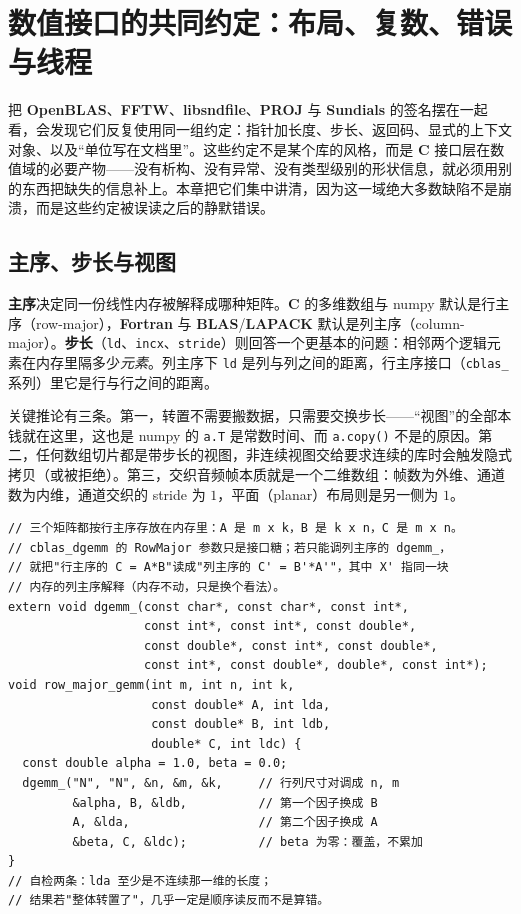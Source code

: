 \documentclass[12pt,a4paper,fontset=fandol]{ctexbook}
\newcommand{\Tp}[1]{\texttt{#1}}
\newcommand{\Bk}{\allowbreak}
\newcommand{\Lib}[1]{\textbf{#1}}
\newcommand{\Lang}[1]{\textsf{\bfseries #1}}
\newcommand{\CL}{\Lang{C}}
\newcommand{\FTN}{\Lang{Fortran}}
\begin{document}
\chapter{数值接口的共同约定：布局、复数、错误与线程}

把 \Lib{OpenBLAS}、\Lib{FFTW}、\Lib{libsndfile}、\Lib{PROJ} 与 \Lib{Sundials} 的签名摆在一起看，会发现它们反复使用同一组约定：指针加长度、步长、返回码、显式的上下文对象、以及``单位写在文档里''。这些约定不是某个库的风格，而是 \CL{} 接口层在数值域的必要产物——没有析构、没有异常、没有类型级别的形状信息，就必须用别的东西把缺失的信息补上。本章把它们集中讲清，因为这一域绝大多数缺陷不是崩溃，而是这些约定被误读之后的静默错误。

\section{主序、步长与视图}

\textbf{主序}决定同一份线性内存被解释成哪种矩阵。\CL{} 的多维数组与 numpy 默认是行主序（row-major），\FTN{} 与 \Lib{BLAS}/{\Bk}\Lib{LAPACK} 默认是列主序（column-major）。\textbf{步长}（\Tp{ld}、\Tp{incx}、\Tp{stride}）则回答一个更基本的问题：相邻两个逻辑元素在内存里隔多少\emph{元素}。列主序下 \Tp{ld} 是列与列之间的距离，行主序接口（\Tp{cblas\_} 系列）里它是行与行之间的距离。

关键推论有三条。第一，转置不需要搬数据，只需要交换步长——``视图''的全部本钱就在这里，这也是 numpy 的 \Tp{a.T} 是常数时间、而 \Tp{a.copy()} 不是的原因。第二，任何数组切片都是带步长的视图，非连续视图交给要求连续的库时会触发隐式拷贝（或被拒绝）。第三，交织音频帧本质就是一个二维数组：帧数为外维、通道数为内维，通道交织的 stride 为 $1$，平面（planar）布局则是另一侧为 $1$。

\begin{lstlisting}[style=cstyle,caption={行主序数据交给列主序内核：靠转置恒等式避免搬数据},label={lst:ch03-order}]
// 三个矩阵都按行主序存放在内存里：A 是 m x k，B 是 k x n，C 是 m x n。
// cblas_dgemm 的 RowMajor 参数只是接口糖；若只能调列主序的 dgemm_，
// 就把"行主序的 C = A*B"读成"列主序的 C' = B'*A'"，其中 X' 指同一块
// 内存的列主序解释（内存不动，只是换个看法）。
extern void dgemm_(const char*, const char*, const int*,
                   const int*, const int*, const double*,
                   const double*, const int*, const double*,
                   const int*, const double*, double*, const int*);
void row_major_gemm(int m, int n, int k,
                    const double* A, int lda,
                    const double* B, int ldb,
                    double* C, int ldc) {
  const double alpha = 1.0, beta = 0.0;
  dgemm_("N", "N", &n, &m, &k,     // 行列尺寸对调成 n, m
         &alpha, B, &ldb,          // 第一个因子换成 B
         A, &lda,                  // 第二个因子换成 A
         &beta, C, &ldc);          // beta 为零：覆盖，不累加
}
// 自检两条：lda 至少是不连续那一维的长度；
// 结果若"整体转置了"，几乎一定是顺序读反而不是算错。
\end{lstlisting}
\end{document}
